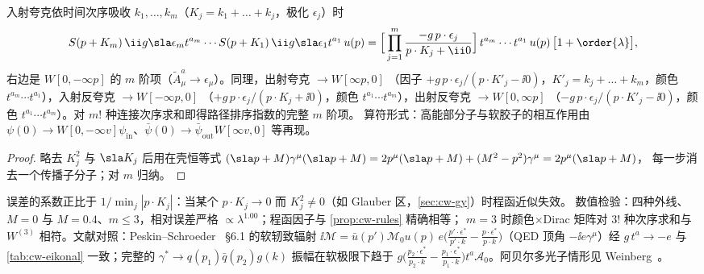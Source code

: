 \begin{proposition}\tagR\label{prop:cw-eikonal}
入射夸克依时间次序吸收 $k_1,\dots,k_m$（$K_j=k_1+\dots+k_j$，极化 $\epsilon_j$）时
\begin{equation}\label{eq:cw-eik-m}
S(p+K_m)\,\ii g\sla\epsilon_mt^{a_m}\cdots S(p+K_1)\,\ii g\sla\epsilon_1t^{a_1}\,u(p)
=\Big[\prod_{j=1}^m\frac{-g\,p\cdot\epsilon_j}{p\cdot K_j+\ii0}\Big]\,t^{a_m}\cdots t^{a_1}\,u(p)\,\big[1+\order{\lambda}\big],
\end{equation}
右边是 $W[0,-\infty p]$ 的 $m$ 阶项（$\tilde A^a_\mu\to\epsilon_\mu$）。同理，出射夸克 $\to W[\infty p,0]$
（因子 $+g\,p\cdot\epsilon_j/(p\cdot K'_j-\ii0)$，$K'_j=k_j+\dots+k_m$，颜色 $t^{a_m}\cdots t^{a_1}$），入射反夸克 $\to W[-\infty p,0]$
（$+g\,p\cdot\epsilon_j/(p\cdot K_j+\ii0)$，颜色 $t^{a_1}\cdots t^{a_m}$），出射反夸克 $\to W[0,\infty p]$
（$-g\,p\cdot\epsilon_j/(p\cdot K'_j-\ii0)$，颜色 $t^{a_1}\cdots t^{a_m}$）。对 $m!$ 种连接次序求和即得路径排序指数的完整 $m$ 阶项。
算符形式：高能部分子与软胶子的相互作用由 $\psi(0)\to W[0,-\infty v]\psi_{\mathrm{in}}$、$\bar\psi(0)\to\bar\psi_{\mathrm{out}}W[\infty v,0]$ 等再现。
\end{proposition}

\begin{proof}
略去 $K_j^2$ 与 $\sla K_j$ 后用在壳恒等式 $(\sla p+M)\gamma^\mu(\sla p+M)=2p^\mu(\sla p+M)+(M^2-p^2)\gamma^\mu=2p^\mu(\sla p+M)$，
每一步消去一个传播子分子；对 $m$ 归纳。
\end{proof}

\begin{remark}[有效范围与检验]\label{rem:cw-eik-valid}
误差的系数正比于 $1/\min_j|p\cdot K_j|$：当某个 $p\cdot K_j\to0$ 而 $K_j^2\neq0$（如 Glauber 区，\cref{sec:cw-gy}）时程函近似失效。
数值检验：四种外线、$M=0$ 与 $M=0.4$、$m\le3$，相对误差严格 $\propto\lambda^{1.00}$；程函因子与 \cref{prop:cw-rules} 精确相等；
$m=3$ 时颜色$\times$Dirac 矩阵对 $3!$ 种次序求和与 $W^{(3)}$ 相符。文献对照：Peskin–Schroeder~\cite{PeskinSchroeder1995} \S6.1 的软轫致辐射
$\ii\mathcal M=\bar u(p')\mathcal M_0u(p)\,e\big(\frac{p'\cdot\epsilon^*}{p'\cdot k}-\frac{p\cdot\epsilon^*}{p\cdot k}\big)$（QED 顶角 $-\ii e\gamma^\mu$）经 $g\,t^a\to-e$ 与
\cref{tab:cw-eikonal} 一致；完整的 $\gamma^*\to q(p_1)\bar q(p_2)g(k)$ 振幅在软极限下趋于
$g\big(\frac{p_2\cdot\epsilon^*}{p_2\cdot k}-\frac{p_1\cdot\epsilon^*}{p_1\cdot k}\big)t^a\mathcal A_0$。阿贝尔多光子情形见 Weinberg~\cite{Weinberg1965}。
\end{remark}

